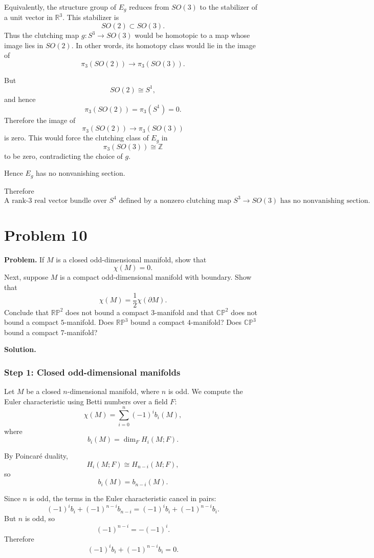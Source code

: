 \documentclass[12pt,a4paper]{article}
\theoremstyle{notespace}
\begin{document}
Equivalently, the structure group of \(E_g\) reduces from \(SO(3)\) to the
stabilizer of a unit vector in \(\mathbb R^3\). This stabilizer is
\[
SO(2)\subset SO(3).
\]
Thus the clutching map \(g:S^3\to SO(3)\) would be homotopic to a map whose image
lies in \(SO(2)\). In other words, its homotopy class would lie in the image of
\[
\pi_3(SO(2))\longrightarrow \pi_3(SO(3)).
\]

But
\[
SO(2)\cong S^1,
\]
and hence
\[
\pi_3(SO(2))=\pi_3(S^1)=0.
\]
Therefore the image of
\[
\pi_3(SO(2))\to \pi_3(SO(3))
\]
is zero. This would force the clutching class of \(E_g\) in
\[
\pi_3(SO(3))\cong \mathbb Z
\]
to be zero, contradicting the choice of \(g\).

Hence \(E_g\) has no nonvanishing section.

Therefore
\[
\boxed{
	\text{A rank-\(3\) real vector bundle over \(S^4\) defined by a nonzero clutching map }
	S^3\to SO(3)
	\text{ has no nonvanishing section.}
}
\]

\section{Problem 10}

\textbf{Problem.}
If \(M\) is a closed odd-dimensional manifold, show that
\[
\chi(M)=0.
\]
Next, suppose \(M\) is a compact odd-dimensional manifold with boundary. Show
that
\[
\chi(M)=\frac{1}{2}\chi(\partial M).
\]
Conclude that \(\mathbb{RP}^2\) does not bound a compact \(3\)-manifold and that
\(\mathbb{CP}^2\) does not bound a compact \(5\)-manifold. Does
\(\mathbb{RP}^3\) bound a compact \(4\)-manifold? Does \(\mathbb{CP}^3\) bound a
compact \(7\)-manifold?

\medskip

\noindent\textbf{Solution.}

\subsubsection*{Step 1: Closed odd-dimensional manifolds}

Let \(M\) be a closed \(n\)-dimensional manifold, where \(n\) is odd. We compute
the Euler characteristic using Betti numbers over a field \(F\):
\[
\chi(M)=\sum_{i=0}^n (-1)^i b_i(M),
\]
where
\[
b_i(M)=\dim_F H_i(M;F).
\]

By Poincar\'e duality,
\[
H_i(M;F)\cong H_{n-i}(M;F),
\]
so
\[
b_i(M)=b_{n-i}(M).
\]

Since \(n\) is odd, the terms in the Euler characteristic cancel in pairs:
\[
(-1)^i b_i + (-1)^{n-i}b_{n-i}
=
(-1)^i b_i + (-1)^{n-i}b_i.
\]
But \(n\) is odd, so
\[
(-1)^{n-i}=-(-1)^i.
\]
Therefore
\[
(-1)^i b_i + (-1)^{n-i}b_i=0.
\]
\end{document}
